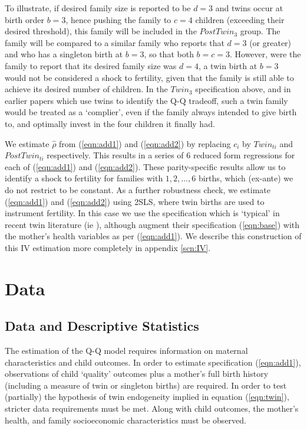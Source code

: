\documentclass{article}[12pt,subeqn]
\begin{document}
\begin{spacing}{1.5}
To illustrate, if desired family size is reported to be $d=3$ and twins occur at birth order $b=3$, hence pushing the family to $c=4$ children (exceeding their desired threshold), this family will be included in the $PostTwin_3$ group.  The family will be compared to a similar family who reports that $d=3$ (or greater) and who has a singleton birth at $b=3$, so that both $b=c=3$.  However, were the family to report that its desired family size was $d=4$, a twin birth at $b=3$ would not be considered a shock to fertility, given that the family is still able to achieve its desired number of children.  In the $Twin_3$ specification above, and in earlier papers which use twins to identify the Q-Q tradeoff, such a twin family would be treated as a `complier', even if the family always intended to give birth to, and optimally invest in the four children it finally had.

We estimate $\hat{\rho}$ from (\ref{eqn:add1}) and (\ref{eqn:add2}) by replacing $c_i$ by $Twin_{ti}$ and $PostTwin_{ti}$ respectively.  This results in a series of 6 reduced form regressions for each of (\ref{eqn:add1}) and (\ref{eqn:add2}).  These parity-specific results allow us to identify a shock to fertility for families with $1,2,\ldots,6$ births, which (ex-ante) we do not restrict to be constant.  As a further robustness check, we estimate (\ref{eqn:add1}) and (\ref{eqn:add2}) using 2SLS, where twin births are used to instrument fertility.  In this case we use the specification which is `typical' in recent twin literature (ie \citet{Angristetal2010}), although augment their specification (\ref{eqn:base}) with the mother's health variables as per (\ref{eqn:add1}).  We describe this construction of this IV estimation more completely in appendix \ref{scn:IV}. 

\section{Data}
\label{scn:data}
\subsection{Data and Descriptive Statistics}
The estimation of the Q-Q model requires information on maternal characteristics and child outcomes.  In order to estimate specification (\ref{eqn:add1}), observations of child `quality' outcomes plus a mother's full birth history (including a measure of twin or singleton births) are required. In order to test (partially) the hypothesis of twin endogeneity implied in equation (\ref{eqn:twin}), stricter data requirements must be met.  Along with child outcomes, the mother's health, and family socioeconomic characteristics must be observed.


\end{spacing}
\end{document}
